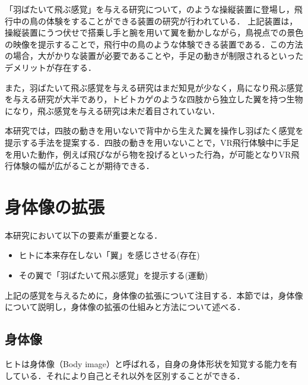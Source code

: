 \begin{small}
    「羽ばたいて飛ぶ感覚」を与える研究について，のような操縦装置に登場し，飛行中の鳥の体験をすることができる装置の研究が行われている\cite{rheiner2014birdly}\cite{hypersuit}．
    上記装置は，操縦装置にうつ伏せで搭乗し手と腕を用いて翼を動かしながら，鳥視点での景色の映像を提示することで，飛行中の鳥のような体験できる装置である．この方法の場合，大がかりな装置が必要であることや，手足の動きが制限されるといったデメリットが存在する．
    
    また，羽ばたいて飛ぶ感覚を与える研究はまだ知見が少なく，鳥になり飛ぶ感覚を与える研究が大半であり，トビトカゲのような四肢から独立した翼を持つ生物になり，飛ぶ感覚を与える研究は未だ着目されていない．

    本研究では，四肢の動きを用いないで背中から生えた翼を操作し羽ばたく感覚を提示する手法を提案する．四肢の動きを用いないことで，VR飛行体験中に手足を用いた動作，例えば飛びながら物を投げるといった行為，が可能となりVR飛行体験の幅が広がることが期待できる．

\section{身体像の拡張}
  本研究において以下の要素が重要となる．
  \begin{itemize}
      \item ヒトに本来存在しない「翼」を感じさせる(存在)
      \item その翼で「羽ばたいて飛ぶ感覚」を提示する(運動)
  \end{itemize}
  上記の感覚を与えるために，身体像の拡張について注目する．本節では，身体像について説明し，身体像の拡張の仕組みと方法について述べる．

  \subsection{身体像}
    ヒトは身体像（Body image）\cite{head1911sensory}と呼ばれる，自身の身体形状を知覚する能力を有している．それにより自己とそれ以外を区別することができる．




\end{small}
